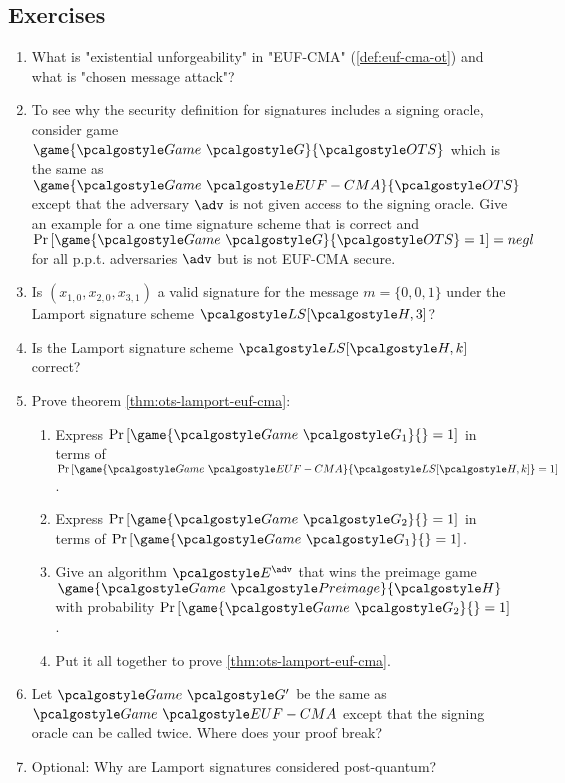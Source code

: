 \subsection{Exercises}
\begin{enumerate}
    \item What is "existential unforgeability" in "EUF-CMA" (\autoref{def:euf-cma-ot}) and what is "chosen message attack"?
    \item To see why the security definition for signatures includes a signing oracle, consider game $\game{\Game~\algo{G}}{\algo{OTS}}$ which is the same as $\game{\Game~\algo{EUF-CMA}}{\algo{OTS}}$ except that the adversary $\adv$ is not given access to the signing oracle.
          Give an example for a one time signature scheme that is correct and $\pr{\game{\Game~\algo{G}}{\algo{OTS}} = 1} = negl$ for all p.p.t. adversaries $\adv$ but is not EUF-CMA secure.
    \item Is $(x_{1,0}, x_{2,0}, x_{3,1})$ a valid signature for the message $m = \{0, 0, 1\}$ under the Lamport signature scheme $\algo{LS}[\algo{H, 3}]$?
    \item Is the Lamport signature scheme $\algo{LS}[\algo{H, k}]$ correct?
    \item Prove theorem \autoref{thm:ots-lamport-euf-cma}:
        \begin{enumerate}
            \item Express $\pr{\game{\Game~\algo{G_1}}{} = 1}$ in terms of $\pr{\game{\Game~\algo{EUF-CMA}}{\algo{LS[\algo{H}, k]}} = 1}$.
            \item Express $\pr{\game{\Game~\algo{G_2}}{} = 1}$ in terms of $\pr{\game{\Game~\algo{G_1}}{} = 1}$.
            \item Give an algorithm $\algo{E}^\adv$ that wins the preimage game $\game{\Game~\algo{Preimage}}{\algo{H}}$ with probability $\pr{\game{\Game~\algo{G_2}}{} = 1}$.
            \item Put it all together to prove \autoref{thm:ots-lamport-euf-cma}.
        \end{enumerate}
    \item Let $\Game~\algo{G'}$ be the same as $\Game~\algo{EUF-CMA}$ except that the signing oracle can be called twice. Where does your proof break?
    \item Optional: Why are Lamport signatures considered post-quantum?
\end{enumerate}

